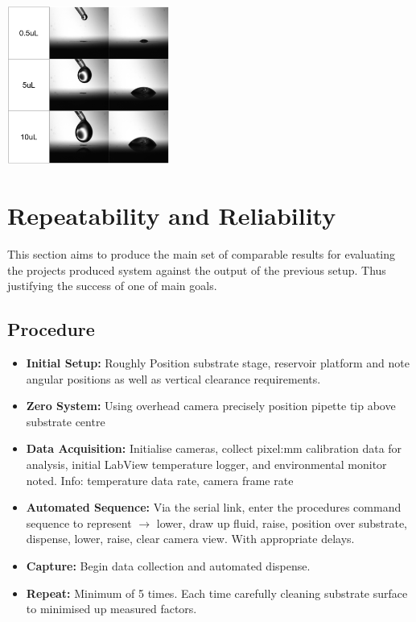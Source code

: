\begin{center}
    \includegraphics[width=0.4\textwidth]{img/volume_range.png}
\end{center}

\section{Repeatability and Reliability}

This section aims to produce the main set of comparable results for evaluating the projects produced system against the output of the previous setup. Thus justifying the success of one of main goals.

\subsection{Procedure}
\begin{itemize}
    \item \textbf{Initial Setup:} Roughly Position substrate stage, reservoir platform and note angular positions as well as vertical clearance requirements.
    \item \textbf{Zero System:} Using overhead camera precisely position pipette tip above substrate centre
    \item \textbf{Data Acquisition:} Initialise cameras, collect pixel:mm calibration data for analysis, initial LabView temperature logger, and environmental monitor noted. Info: temperature data rate, camera frame rate
    \item \textbf{Automated Sequence:} Via the serial link, enter the procedures command sequence to represent $\rightarrow$ lower, draw up fluid, raise, position over substrate, dispense, lower, raise, clear camera view. With appropriate delays.
    \item \textbf{Capture:} Begin data collection and automated dispense.
    \item \textbf{Repeat: } Minimum of 5 times. Each time carefully cleaning substrate surface to minimised up measured factors.
\end{itemize}

